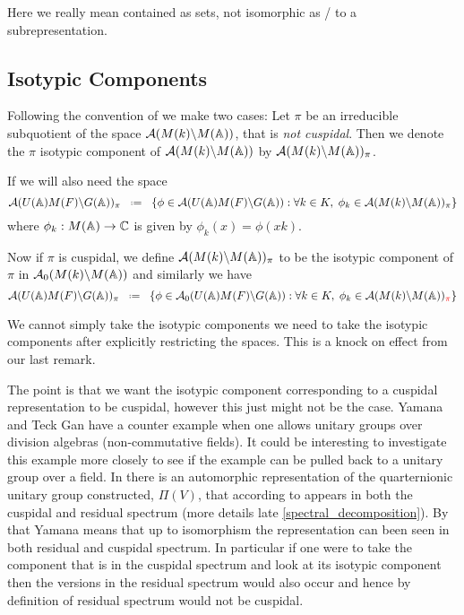 \begin{Remark}
    Here we really mean contained as sets, not isomorphic as / to a subrepresentation.
\end{Remark}

\subsection{Isotypic Components}\label{automorphic_isotypic_subspaces}
Following the convention of \cite[II.1]{moeglinSpectralDecompositionEisenstein1995} we make two cases:
Let \(\pi\) be an irreducible subquotient of the space \(\mathcal{A}(M(k) \backslash M(\A))\), that is \textit{not cuspidal}. Then we denote the \(\pi\) isotypic component of \(\mathcal{A}(M(k) \backslash M(\A))\) by \(\mathcal{A}(M(k) \backslash M(\A))_\pi\).

If we will also need the space 
\[\mathcal{A}(U(\A)M(F) \backslash G(\A))_\pi \defeq \{\phi \in \mathcal{A}(U(\A)M(F) \backslash G(\A)) : \forall k\in K, \; \phi_k\in\mathcal{A}(M(k) \backslash M(\A))_\pi \}\]
where \(\phi_k: M(\A) \to \C\) is given by \(\phi_k(x) = \phi(xk)\).

Now if \(\pi\) is cuspidal, we define \(\mathcal{A}(M(k) \backslash M(\A))_\pi\) to be the isotypic component of \(\pi\) in \(\mathcal{A}_0(M(k) \backslash M(\A))\) and similarly we have 
\[\mathcal{A}(U(\A)M(F) \backslash G(\A))_\pi \defeq \{\phi \in \mathcal{A}_0(U(\A)M(F) \backslash G(\A)) : \forall k\in K, \; \phi_k\in\mathcal{A}(M(k) \backslash M(\A))_{\textcolor{red}{\pi}} \}\]
\begin{Remark}
    We cannot simply take the isotypic components we need to take the isotypic components after explicitly restricting the spaces. This is a knock on effect from our last remark.
\end{Remark}

The point is that we want the isotypic component corresponding to a cuspidal representation to be cuspidal, however this just might not be the case. 
Yamana and Teck Gan have a counter example when one allows unitary groups over division algebras (non-commutative fields). It could be interesting to investigate this example more closely to see if the example can be pulled back to a unitary group over a field. In \cite{yamanaSiegelWeilFormulaQuaternionic2013} there is an automorphic representation of the quarternionic unitary group constructed, \(\Pi(V)\), that according to \cite[Rm. 7.12]{yamanaSiegelWeilFormulaQuaternionic2013} appears in both the cuspidal and residual spectrum (more details late \ref{spectral_decomposition}). By that Yamana means that up to isomorphism the representation can been seen in both residual and cuspidal spectrum. In particular if one were to take the component that is in the cuspidal spectrum and look at its isotypic component then the versions in the residual spectrum would also occur and hence by definition of residual spectrum would not be cuspidal.

